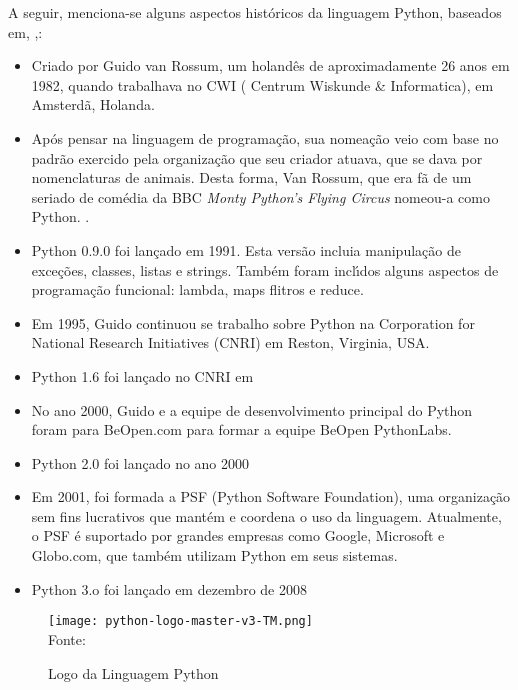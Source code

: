A seguir, menciona-se alguns aspectos hist\'{o}ricos da linguagem Python, baseados em\cite{Perkovic2016}, \cite{Severance2015},\cite{Labaki}:
\begin{itemize}
  \item Criado por  Guido van Rossum, um holandês de aproximadamente 26 anos em 1982, quando trabalhava no CWI ( Centrum Wiskunde \& Informatica), em Amsterd\~{a}, Holanda.
  \item  Após pensar na linguagem de programação, sua nomeação veio com base no padrão exercido pela organização que seu criador atuava, que se dava por nomenclaturas de animais. Desta forma, Van Rossum, que era fã de um seriado de com\'{e}dia da BBC \textit{Monty Python's Flying Circus} nomeou-a como Python. .
  \item Python 0.9.0 foi lan\c{c}ado em 1991.  Esta vers\~{a}o incluia manipula\c{c}\~{a}o de exce\c{c}\~{o}es, classes, listas e strings. Tamb\'{e}m foram incl\'{\i}dos alguns aspectos de programa\c{c}\~{a}o funcional: lambda, maps flitros e reduce.

  \item  Em 1995, Guido continuou se trabalho sobre Python na Corporation for National Research Initiatives (CNRI) em Reston, Virginia, USA.
  \item Python 1.6 foi lan\c{c}ado no CNRI em
  \item  No ano 2000, Guido e a equipe de desenvolvimento principal do Python foram para BeOpen.com para formar a equipe BeOpen PythonLabs.
  \item Python 2.0 foi lan\c{c}ado no ano 2000
  \item Em 2001, foi formada a PSF (Python Software Foundation), uma organização sem fins lucrativos que mantém e coordena o uso da linguagem. Atualmente, o PSF é suportado por grandes empresas como Google, Microsoft e Globo.com, que também utilizam Python em seus sistemas.
  \item Python 3.o foi lan\c{c}ado em dezembro de 2008 
\end{itemize}

   \begin{figure}[H]
    \begin{center}
        \caption{Logo da Linguagem Python} \label{ling1}
        \texttt{[image: python-logo-master-v3-TM.png]} \\
        {\tiny \sf Fonte: \cite{VanRossum1995}}
    \end{center}
   \end{figure}


